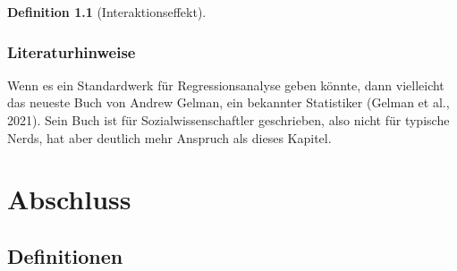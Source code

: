 \documentclass[
  letterpaper,
]{scrbook}
\theoremstyle{definition}
\theoremstyle{definition}
\theoremstyle{definition}
\newtheorem{definition}{Definition}[chapter]
\theoremstyle{remark}
\begin{document}
\begin{definition}[Interaktionseffekt]
\section{Literaturhinweise}\label{literaturhinweise-8}

Wenn es ein Standardwerk für Regressionsanalyse geben könnte, dann
vielleicht das neueste Buch von Andrew Gelman, ein bekannter Statistiker
(Gelman et al., 2021). Sein Buch ist für Sozialwissenschaftler
geschrieben, also nicht für typische Nerds, hat aber deutlich mehr
Anspruch als dieses Kapitel.

\part{Abschluss}

\chapter{Definitionen}\label{definitionen}


\end{definition}
\end{document}
